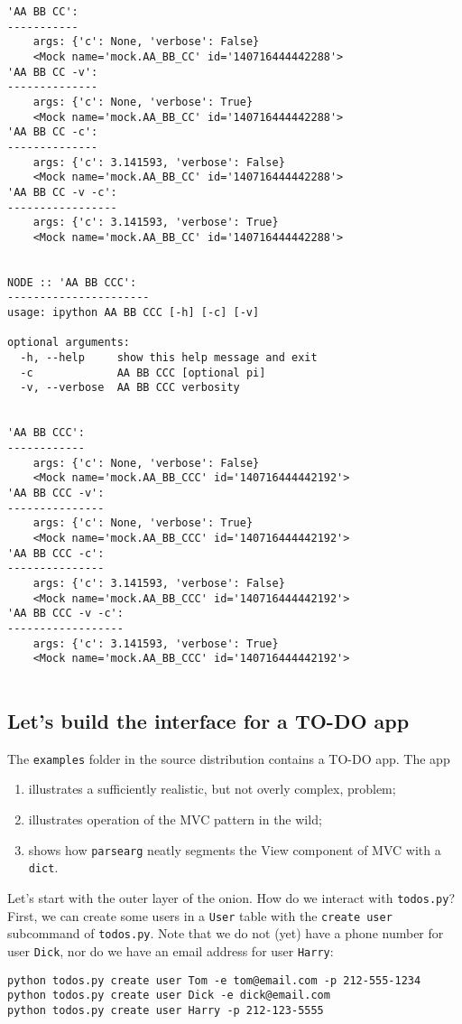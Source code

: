 \documentclass[10pt]{amsart}
\numberwithin{equation}{section}
\begin{document}
\begin{verbatim}
'AA BB CC':
-----------
	args: {'c': None, 'verbose': False}
	<Mock name='mock.AA_BB_CC' id='140716444442288'>
'AA BB CC -v':
--------------
	args: {'c': None, 'verbose': True}
	<Mock name='mock.AA_BB_CC' id='140716444442288'>
'AA BB CC -c':
--------------
	args: {'c': 3.141593, 'verbose': False}
	<Mock name='mock.AA_BB_CC' id='140716444442288'>
'AA BB CC -v -c':
-----------------
	args: {'c': 3.141593, 'verbose': True}
	<Mock name='mock.AA_BB_CC' id='140716444442288'>


NODE :: 'AA BB CCC':
----------------------
usage: ipython AA BB CCC [-h] [-c] [-v]

optional arguments:
  -h, --help     show this help message and exit
  -c             AA BB CCC [optional pi]
  -v, --verbose  AA BB CCC verbosity


'AA BB CCC':
------------
	args: {'c': None, 'verbose': False}
	<Mock name='mock.AA_BB_CCC' id='140716444442192'>
'AA BB CCC -v':
---------------
	args: {'c': None, 'verbose': True}
	<Mock name='mock.AA_BB_CCC' id='140716444442192'>
'AA BB CCC -c':
---------------
	args: {'c': 3.141593, 'verbose': False}
	<Mock name='mock.AA_BB_CCC' id='140716444442192'>
'AA BB CCC -v -c':
------------------
	args: {'c': 3.141593, 'verbose': True}
	<Mock name='mock.AA_BB_CCC' id='140716444442192'>


\end{verbatim}

\newpage
\subsection{Let's build the interface for a TO-DO app}
\label{sec:org0a24e4e}
The \texttt{examples} folder in the source distribution contains a TO-DO app.
The app

\begin{enumerate}
\item illustrates a sufficiently realistic, but not overly complex, problem;
\item illustrates operation of the MVC pattern in the wild;
\item shows how \texttt{parsearg} neatly segments the View component of MVC with a \texttt{dict}.
\end{enumerate}

Let's start with the outer layer of the onion. How do we interact with
\texttt{todos.py}?  First, we can create some users in a \texttt{User} table with the 
\texttt{create user} subcommand of \texttt{todos.py}.  Note that we do not (yet) have a phone
number for user \texttt{Dick}, nor do we have an email address for user \texttt{Harry}:
\begin{verbatim}
python todos.py create user Tom -e tom@email.com -p 212-555-1234
python todos.py create user Dick -e dick@email.com
python todos.py create user Harry -p 212-123-5555
\end{verbatim}
\end{document}
